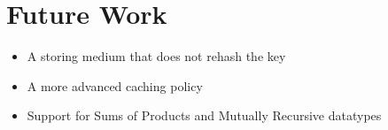 \section{Future Work}

\begin{itemize}
  \item A storing medium that does not rehash the key
  \item A more advanced caching policy
  \item Support for Sums of Products and Mutually Recursive datatypes
\end{itemize}